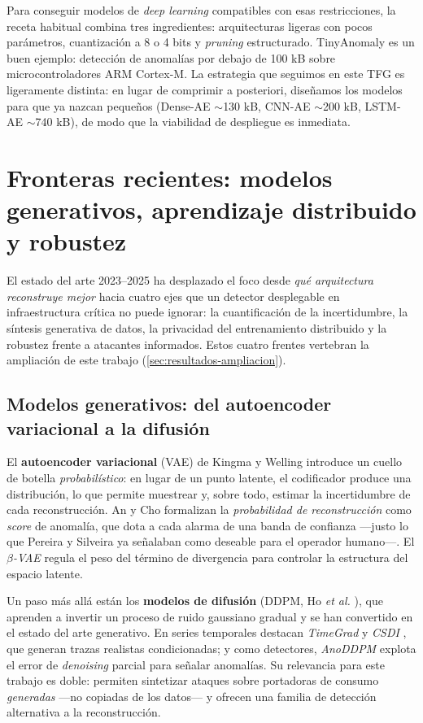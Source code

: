 Para conseguir modelos de \textit{deep learning} compatibles con esas restricciones, la receta habitual combina tres ingredientes: arquitecturas ligeras con pocos parámetros, cuantización a 8 o 4 bits y \textit{pruning} estructurado. TinyAnomaly \cite{nguyen2023tiny} es un buen ejemplo: detección de anomalías por debajo de 100 kB sobre microcontroladores ARM Cortex-M. La estrategia que seguimos en este TFG es ligeramente distinta: en lugar de comprimir a posteriori, diseñamos los modelos para que ya nazcan pequeños (Dense-AE $\sim$130 kB, CNN-AE $\sim$200 kB, LSTM-AE $\sim$740 kB), de modo que la viabilidad de despliegue es inmediata.

\section{Fronteras recientes: modelos generativos, aprendizaje distribuido y robustez}
\label{sec:soa-fronteras}

El estado del arte 2023--2025 ha desplazado el foco desde \emph{qué arquitectura reconstruye mejor} hacia cuatro ejes que un detector desplegable en infraestructura crítica no puede ignorar: la cuantificación de la incertidumbre, la síntesis generativa de datos, la privacidad del entrenamiento distribuido y la robustez frente a atacantes informados. Estos cuatro frentes vertebran la ampliación de este trabajo (\cref{sec:resultados-ampliacion}).

\subsection{Modelos generativos: del autoencoder variacional a la difusión}

El \textbf{autoencoder variacional} (VAE) de Kingma y Welling \cite{kingma2014vae} introduce un cuello de botella \emph{probabilístico}: en lugar de un punto latente, el codificador produce una distribución, lo que permite muestrear y, sobre todo, estimar la incertidumbre de cada reconstrucción. An y Cho \cite{an2015reconstruction} formalizan la \emph{probabilidad de reconstrucción} como \textit{score} de anomalía, que dota a cada alarma de una banda de confianza ---justo lo que Pereira y Silveira \cite{pereira2018unsupervised} ya señalaban como deseable para el operador humano---. El \textit{$\beta$-VAE} \cite{higgins2017betavae} regula el peso del término de divergencia para controlar la estructura del espacio latente.

Un paso más allá están los \textbf{modelos de difusión} (DDPM, Ho \emph{et al.} \cite{ho2020ddpm}), que aprenden a invertir un proceso de ruido gaussiano gradual y se han convertido en el estado del arte generativo. En series temporales destacan \textit{TimeGrad} \cite{rasul2021timegrad} y \textit{CSDI} \cite{tashiro2021csdi}, que generan trazas realistas condicionadas; y como detectores, \textit{AnoDDPM} \cite{wyatt2022anoddpm} explota el error de \emph{denoising} parcial para señalar anomalías. Su relevancia para este trabajo es doble: permiten sintetizar ataques sobre portadoras de consumo \emph{generadas} ---no copiadas de los datos--- y ofrecen una familia de detección alternativa a la reconstrucción.

